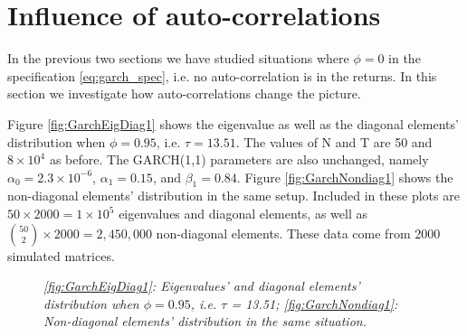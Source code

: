 \section{Influence of auto-correlations}
\label{sec:garch_nonzero_phi}
In the previous two sections we have studied situations where
$\phi=0$ in the specification \ref{eq:garch_spec}, i.e. no
auto-correlation is in the returns. In this section we investigate how
auto-correlations change the picture.


Figure \ref{fig:GarchEigDiag1} shows the eigenvalue as well as the
diagonal elements' distribution when $\phi = 0.95$, i.e. $\tau =
13.51$. The values of N and T are 50 and $8\times 10^4$ as before. The
GARCH(1,1) parameters are also unchanged, namely $\alpha_0 = 2.3\times
10^{-6}$, $\alpha_1 = 0.15$, and $\beta_1 = 0.84$. Figure
\ref{fig:GarchNondiag1} shows the non-diagonal elements' distribution
in the same setup. Included in these plots are $50 \times 2000 =
1\times 10^5$ eigenvalues and diagonal elements, as well as ${50
  \choose 2} \times 2000 = 2,450,000$ non-diagonal elements. These
data come from 2000 simulated matrices.
\begin{figure}[htb!]
  \centering
  \caption{\small \it \ref{fig:GarchEigDiag1}: Eigenvalues' and
    diagonal elements' distribution when $\phi = 0.95$, i.e. $\tau$ =
    13.51; \ref{fig:GarchNondiag1}: Non-diagonal elements'
    distribution in the same situation.}
\end{figure}

